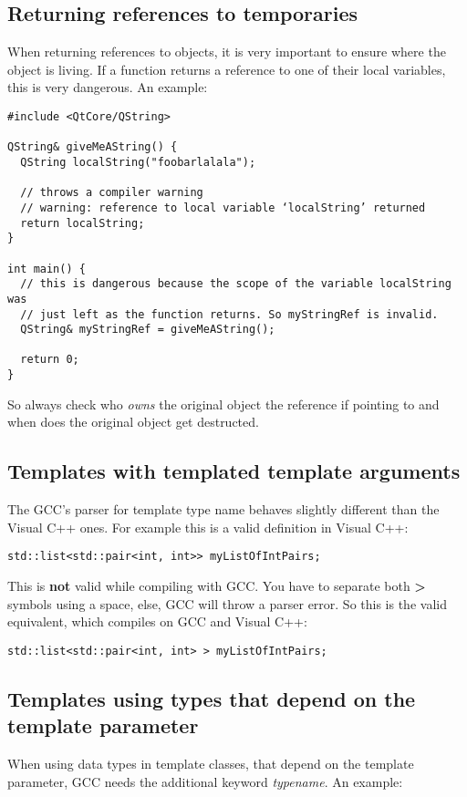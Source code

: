 \subsection{Returning references to temporaries} When returning references to objects, it is very important to ensure where the object is living. If a function returns a reference to one of their local variables, this is very dangerous. An example:
\begin{verbatim}
#include <QtCore/QString>

QString& giveMeAString() {
  QString localString("foobarlalala");

  // throws a compiler warning
  // warning: reference to local variable ‘localString’ returned
  return localString;
}

int main() {
  // this is dangerous because the scope of the variable localString was 
  // just left as the function returns. So myStringRef is invalid.
  QString& myStringRef = giveMeAString();

  return 0;
}
\end{verbatim}


So always check who \emph{owns} the original object the reference if pointing to and when does the original object get destructed.

\subsection{Templates with templated template arguments} The GCC's parser for template type name behaves slightly different than the Visual C++ ones. For example this is a valid definition in Visual C++: 
\begin{verbatim}
std::list<std::pair<int, int>> myListOfIntPairs; 
\end{verbatim}

This is \textbf{not} valid while compiling with GCC. You have to separate both \textbf{>} symbols using a space, else, GCC will throw a parser error. So this is the valid equivalent, which compiles on GCC and Visual C++: 
\begin{verbatim}
std::list<std::pair<int, int> > myListOfIntPairs; 
\end{verbatim}

\subsection{Templates using types that depend on the template parameter} When using data types in template classes, that depend on the template parameter, GCC needs the additional keyword \emph{typename}. An example:

